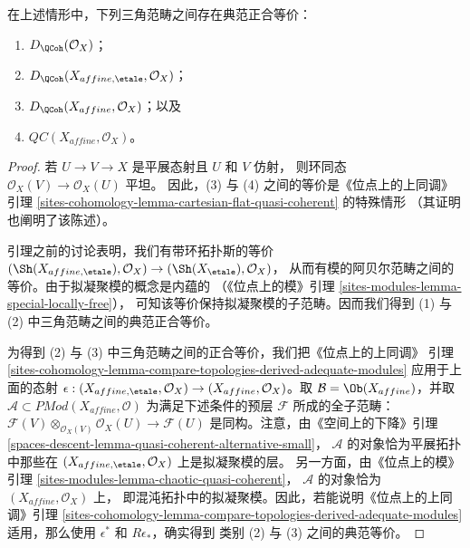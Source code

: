 \begin{lemma}
\label{lemma-DQCoh-alternative-small}
在上述情形中，下列三角范畴之间存在典范正合等价：
\begin{enumerate}
\item $D_\QCoh(\mathcal{O}_X)$；
\item $D_\QCoh(X_{affine, \etale}, \mathcal{O}_X)$；
\item $D_\QCoh(X_{affine}, \mathcal{O}_X)$；以及
\item $\mathit{QC}(X_{affine}, \mathcal{O}_X)$。
\end{enumerate}
\end{lemma}

\begin{proof}
若 $U \to V \to X$ 是平展态射且 $U$ 和 $V$ 仿射，
则环同态 $\mathcal{O}_X(V) \to \mathcal{O}_X(U)$ 平坦。
因此，(3) 与 (4) 之间的等价是《位点上的上同调》引理
\ref{sites-cohomology-lemma-cartesian-flat-quasi-coherent} 的特殊情形
（其证明也阐明了该陈述）。

\medskip\noindent
引理之前的讨论表明，我们有带环拓扑斯的等价
$(\Sh(X_{affine, \etale}), \mathcal{O}_X) \to (\Sh(X_\etale), \mathcal{O}_X)$，
从而有模的阿贝尔范畴之间的等价。由于拟凝聚模的概念是内蕴的
（《位点上的模》引理 \ref{sites-modules-lemma-special-locally-free}），
可知该等价保持拟凝聚模的子范畴。因而我们得到 (1) 与 (2)
中三角范畴之间的典范正合等价。

\medskip\noindent
为得到 (2) 与 (3) 中三角范畴之间的正合等价，我们把《位点上的上同调》
引理 \ref{sites-cohomology-lemma-compare-topologies-derived-adequate-modules}
应用于上面的态射 $\epsilon : (X_{affine, \etale}, \mathcal{O}_X) \to
(X_{affine}, \mathcal{O}_X)$。取
$\mathcal{B} = \Ob(X_{affine})$，并取
$\mathcal{A} \subset \textit{PMod}(X_{affine}, \mathcal{O})$
为满足下述条件的预层 $\mathcal{F}$ 所成的全子范畴：
$\mathcal{F}(V) \otimes_{\mathcal{O}_X(V)} \mathcal{O}_X(U)
\to \mathcal{F}(U)$ 是同构。注意，由《空间上的下降》引理
\ref{spaces-descent-lemma-quasi-coherent-alternative-small}，
$\mathcal{A}$ 的对象恰为平展拓扑中那些在
$(X_{affine, \etale}, \mathcal{O}_X)$ 上是拟凝聚模的层。
另一方面，由《位点上的模》引理
\ref{sites-modules-lemma-chaotic-quasi-coherent}，
$\mathcal{A}$ 的对象恰为 $(X_{affine}, \mathcal{O}_X)$ 上，
即混沌拓扑中的拟凝聚模。因此，若能说明《位点上的上同调》引理
\ref{sites-cohomology-lemma-compare-topologies-derived-adequate-modules}
适用，那么使用 $\epsilon^*$ 和 $R\epsilon_*$，确实得到
类别 (2) 与 (3) 之间的典范等价。


\end{proof}
